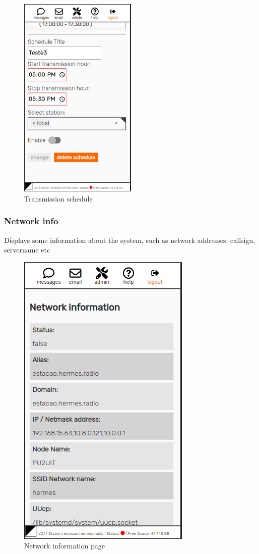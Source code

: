 \documentclass[11pt,a4paper]{article}
\begin{document}
\begin{figure}[H]
    \centering
    \includegraphics[width=0.5\textwidth]{screenshots/frontend/en/central2.png}
    \caption{Transmission schedule}
	\vspace{-10pt}
    \label{fig:central2}
\end{figure} 


\subsubsection{Network info} 
\label{gui_net_info}

Displays some information about the system, such as network addresses, callsign, servername etc
     \begin{figure}[H]
     \vspace{-10pt}
    \centering
    \includegraphics[width=0.5\columnwidth]{screenshots/frontend/en/networkinfo.png}
    \caption{Network information page}
    \label{fig:netinfo}
  
    \end{figure}
    
\end{document}
